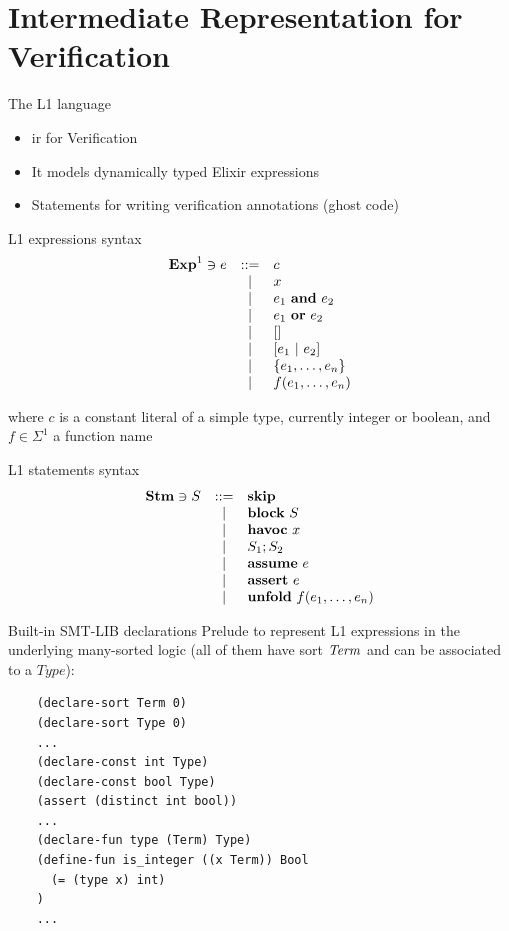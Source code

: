 \documentclass{beamer}
\begin{document}
  \section{Intermediate Representation for Verification}
  \begin{frame}{The L1 language}
    \begin{itemize}
      \item \pause \gls*{ir} for Verification
      \item \pause It models dynamically typed Elixir expressions
      \item \pause Statements for writing verification annotations (ghost code)
    \end{itemize}
  \end{frame}
  \begin{frame}{L1 expressions syntax}
    \[
      \begin{array}{rcll}
        \mathbf{Exp}^{1} \ni e & ::= & c \\
        & | & x \\
        & | & e_1~\textbf{and}~e_2 \\
        & | & e_1~\textbf{or}~e_2 \\
        & | & [] \\
        & | & [e_1~|~e_2] \\
        & | & \{e_1, \ldots, e_n\} \\
        & | & f(e_1, \ldots, e_n) \\
      \end{array}
    \]

    \pause where $c$ is a constant literal of a simple type, currently integer or 
    boolean, and $f \in \Sigma^1$ a function name
  \end{frame}
  \begin{frame}{L1 statements syntax}
    \[
      \begin{array}{rcll}
        \mathbf{Stm} \ni S & ::= & \textbf{skip} \\
        & | & \textbf{block}~S \\
        & | & \textbf{havoc}~x \\
        & | & S_1;S_2 \\
        & | & \textbf{assume}~e \\
        & | & \textbf{assert}~e \\
        & | & \textbf{unfold}~f(e_1, \dots, e_n) \\
      \end{array}
    \]
  \end{frame}
  \begin{frame}[fragile]{Built-in SMT-LIB declarations}
    Prelude to represent L1 expressions in the underlying many-sorted logic
    (all of them have sort $\mathit{Term}$ and can be associated to a $\mathit{Type}$):

    \pause

    \small
    \begin{verbatim}
    (declare-sort Term 0)
    (declare-sort Type 0)
    ...
    (declare-const int Type)
    (declare-const bool Type)
    (assert (distinct int bool))
    ...
    (declare-fun type (Term) Type)
    (define-fun is_integer ((x Term)) Bool 
      (= (type x) int)
    )
    ...
    \end{verbatim}
  \end{frame}
\end{document}
